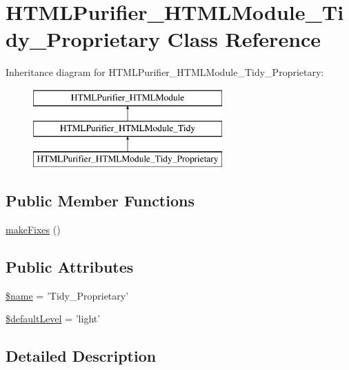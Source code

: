 \hypertarget{classHTMLPurifier__HTMLModule__Tidy__Proprietary}{\section{H\+T\+M\+L\+Purifier\+\_\+\+H\+T\+M\+L\+Module\+\_\+\+Tidy\+\_\+\+Proprietary Class Reference}
\label{classHTMLPurifier__HTMLModule__Tidy__Proprietary}
}
Inheritance diagram for H\+T\+M\+L\+Purifier\+\_\+\+H\+T\+M\+L\+Module\+\_\+\+Tidy\+\_\+\+Proprietary\+:\begin{figure}[H]
\begin{center}
\leavevmode
\includegraphics[height=3.000000cm]{classHTMLPurifier__HTMLModule__Tidy__Proprietary}
\end{center}
\end{figure}
\subsection*{Public Member Functions}
\begin{DoxyCompactItemize}
\item 
\hyperlink{classHTMLPurifier__HTMLModule__Tidy__Proprietary_a0036541fefb733c2b1b0caba77207872}{make\+Fixes} ()
\end{DoxyCompactItemize}
\subsection*{Public Attributes}
\begin{DoxyCompactItemize}
\item 
\hyperlink{classHTMLPurifier__HTMLModule__Tidy__Proprietary_afc1b22277b5705ae192b8a6ddfd0a070}{\$name} = 'Tidy\+\_\+\+Proprietary'
\item 
\hyperlink{classHTMLPurifier__HTMLModule__Tidy__Proprietary_ae14ae65b6d47b04cb043e4d9b6abe9de}{\$default\+Level} = 'light'
\end{DoxyCompactItemize}


\subsection{Detailed Description}


